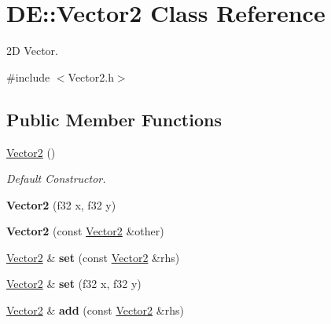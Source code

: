 \hypertarget{classDE_1_1Vector2}{}\section{DE\+:\+:Vector2 Class Reference}
\label{classDE_1_1Vector2}


2D Vector.  




{\ttfamily \#include $<$Vector2.\+h$>$}

\subsection*{Public Member Functions}
\begin{DoxyCompactItemize}
\item 
\hyperlink{classDE_1_1Vector2_aea4fca2b7e8b149153edecb3ad8d988e}{Vector2} ()\hypertarget{classDE_1_1Vector2_aea4fca2b7e8b149153edecb3ad8d988e}{}\label{classDE_1_1Vector2_aea4fca2b7e8b149153edecb3ad8d988e}

\begin{DoxyCompactList}\small\item\em Default Constructor. \end{DoxyCompactList}\item 
{\bfseries Vector2} (f32 x, f32 y)\hypertarget{classDE_1_1Vector2_a6b9dc2a7e1cd5554a4d8d3bba4eab103}{}\label{classDE_1_1Vector2_a6b9dc2a7e1cd5554a4d8d3bba4eab103}

\item 
{\bfseries Vector2} (const \hyperlink{classDE_1_1Vector2}{Vector2} \&other)\hypertarget{classDE_1_1Vector2_ab6bf7d974ae767177f2ed39b31842b8e}{}\label{classDE_1_1Vector2_ab6bf7d974ae767177f2ed39b31842b8e}

\item 
\hyperlink{classDE_1_1Vector2}{Vector2} \& {\bfseries set} (const \hyperlink{classDE_1_1Vector2}{Vector2} \&rhs)\hypertarget{classDE_1_1Vector2_a591eb991f8782ab2a74adf77722d5966}{}\label{classDE_1_1Vector2_a591eb991f8782ab2a74adf77722d5966}

\item 
\hyperlink{classDE_1_1Vector2}{Vector2} \& {\bfseries set} (f32 x, f32 y)\hypertarget{classDE_1_1Vector2_a74e9102e534f9c75f52ed280d2958b1d}{}\label{classDE_1_1Vector2_a74e9102e534f9c75f52ed280d2958b1d}

\item 
\hyperlink{classDE_1_1Vector2}{Vector2} \& {\bfseries add} (const \hyperlink{classDE_1_1Vector2}{Vector2} \&rhs)\hypertarget{classDE_1_1Vector2_a41942dbaa5c06206949eac3c1ec3a154}{}\label{classDE_1_1Vector2_a41942dbaa5c06206949eac3c1ec3a154}


\end{DoxyCompactItemize}
